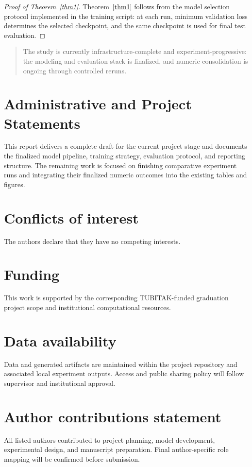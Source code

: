 \documentclass[unnumsec,webpdf,contemporary,large]{oup-authoring-template}%
\theoremstyle{thmstyleone}%
\theoremstyle{thmstyletwo}%
\theoremstyle{thmstylethree}%
\begin{document}
\begin{proof}[Proof of Theorem~{\upshape\ref{thm1}}]
Theorem~\ref{thm1} follows from the model selection protocol implemented in the training script: at each run, minimum validation loss determines the selected checkpoint, and the same checkpoint is used for final test evaluation.
\end{proof}

\begin{quote}
The study is currently infrastructure-complete and experiment-progressive: the modeling and evaluation stack is finalized, and numeric consolidation is ongoing through controlled reruns.
\end{quote}

\section{Administrative and Project Statements}

This report delivers a complete draft for the current project stage and documents the finalized model pipeline, training strategy, evaluation protocol, and reporting structure. The remaining work is focused on finishing comparative experiment runs and integrating their finalized numeric outcomes into the existing tables and figures.

\section{Conflicts of interest}
The authors declare that they have no competing interests.

\section{Funding}
This work is supported by the corresponding TUBITAK-funded graduation project scope and institutional computational resources.

\section{Data availability}
Data and generated artifacts are maintained within the project repository and associated local experiment outputs. Access and public sharing policy will follow supervisor and institutional approval.

\section{Author contributions statement}
All listed authors contributed to project planning, model development, experimental design, and manuscript preparation. Final author-specific role mapping will be confirmed before submission.
\end{document}
